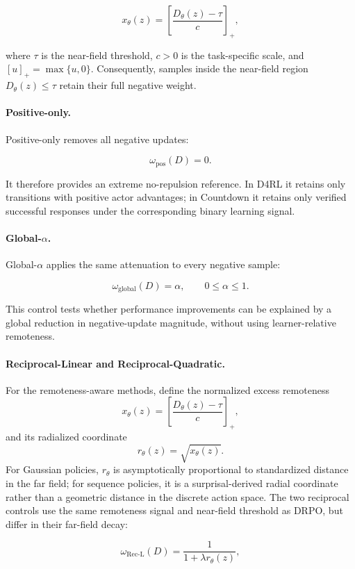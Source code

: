 \[
x_\theta(z)
=
\left[
\frac{D_\theta(z)-\tau}{c}
\right]_{+},
\]

where \(\tau\) is the near-field threshold, \(c>0\) is the task-specific
scale, and \([u]_{+}=\max\{u,0\}\). Consequently, samples inside the
near-field region \(D_\theta(z)\leq\tau\) retain their full negative
weight.

\paragraph{Positive-only.}

Positive-only removes all negative updates:

\[
\omega_{\mathrm{pos}}(D)=0.
\]

It therefore provides an extreme no-repulsion reference. In D4RL it
retains only transitions with positive actor advantages; in Countdown
it retains only verified successful responses under the corresponding
binary learning signal.

\paragraph{Global-\(\alpha\).}

Global-\(\alpha\) applies the same attenuation to every negative sample:

\[
\omega_{\mathrm{global}}(D)=\alpha,
\qquad
0\leq\alpha\leq 1.
\]

This control tests whether performance improvements can be explained by
a global reduction in negative-update magnitude, without using
learner-relative remoteness.

\paragraph{Reciprocal-Linear and Reciprocal-Quadratic.}
For the remoteness-aware methods, define the normalized excess
remoteness
\[
x_\theta(z)
=
\left[
\frac{D_\theta(z)-\tau}{c}
\right]_{+},
\]
and its radialized coordinate
\[
r_\theta(z)=\sqrt{x_\theta(z)}.
\]
For Gaussian policies, \(r_\theta\) is asymptotically proportional to
standardized distance in the far field; for sequence policies, it is a
surprisal-derived radial coordinate rather than a geometric distance in
the discrete action space.
The two reciprocal controls use the same remoteness signal and
near-field threshold as DRPO, but differ in their far-field decay:

\[
\omega_{\mathrm{Rec\text{-}L}}(D)
=
\frac{1}{1+\lambda r_\theta(z)},
\]

